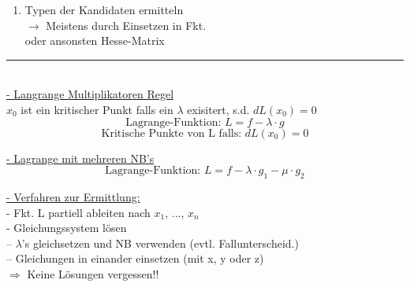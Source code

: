 \documentclass[6pt]{article}
\begin{document}
\begin{multicols*}{3}
\begin{enumerate}[label=(\roman*), itemsep=2pt, parsep=2pt]
\begin{enumerate}[ itemsep=2pt, parsep=2pt]
\begin{itemize}
\begin{itemize}
																		(a) Rand st{\"u}ckweise parametrisieren \\
																		$\rightarrow$ Kritische Punkte der St{\"u}cke ermitteln \\
																		(b) Eckpunkte
														\end{itemize}
									\end{itemize}	
						\end{enumerate}	
			\item 	Typen der Kandidaten ermitteln \\
						$\rightarrow $ Meistens durch Einsetzen in Fkt. \\
						oder ansonsten Hesse-Matrix
		\end{enumerate}

	\vspace{-2mm}
  	\noindent\textcolor{gray}{\rule{9cm}{0.1pt}}
	\vspace{-2mm}\\

	\underline{- Langrange Multiplikatoren Regel} \vspace{1mm}\\
	$x_0$ ist ein kritischer Punkt falls ein $\lambda$ exisitert, s.d. $dL(x_0)=0$
			\[
					\text{Lagrange-Funktion: }L = f - \lambda \cdot g
			\]
			\[
					\text{Kritische Punkte von L falls: } dL(x_0) = 0
			\]
			
	\vspace{1mm}		
	\underline{- Lagrange mit mehreren NB's} \vspace{1mm}\\
			\[
					\text{Lagrange-Funktion: }L = f - \lambda \cdot g_1 - \mu \cdot g_2
			\]
			\vspace{1mm}
			
			\underline{- Verfahren zur Ermittlung:} \vspace{1mm}\\
			- Fkt. L partiell ableiten nach $x_1$, ..., $x_n$ \\
			- Gleichungssystem l{\"o}sen \\
			-- $\lambda$'s gleichsetzen und NB verwenden (evtl. Fallunterscheid.) \\
			-- Gleichungen in einander einsetzen (mit x, y oder z)\\
			$\Rightarrow$ Keine L{\"o}sungen vergessen!!

	
	

\end{multicols*}
\end{document}
